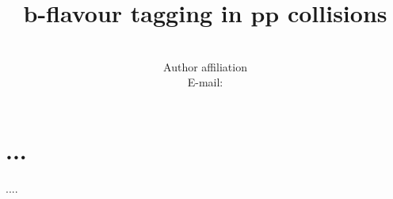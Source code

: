 \documentclass{PoS}
\title{$\bm{b}$-flavour tagging in $\bm{p\!p}$ collisions}
\author{\speaker{Alex Birnkraut}\\%
        Author affiliation\\
        E-mail: \email{a.birnkraut@cern.ch}}
\begin{document}
\section{...}

\begin{thebibliography}{99}
....

\end{thebibliography}
\end{document}
